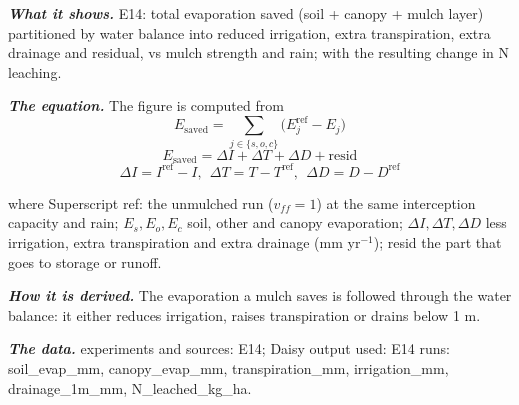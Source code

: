 \par\vspace{6pt}\noindent{}\par\nobreak
{}\label{fig:a20_3}
\par\noindent\textbf{\color{khmag}\emph{What it shows.}} E14: total evaporation saved (soil + canopy + mulch layer) partitioned by water balance into reduced irrigation, extra transpiration, extra drainage and residual, vs mulch strength and rain; with the resulting change in N leaching.
\par\noindent\textbf{\color{khmag}\emph{The equation.}} The figure is computed from
\begin{equation}\boxed{E_{\mathrm{saved}}=\sum_{j\in\{s,o,c\}}\bigl(E_j^{\mathrm{ref}}-E_j\bigr)}\end{equation}
\begin{equation}\boxed{E_{\mathrm{saved}}=\Delta I+\Delta T+\Delta D+\text{resid}}\end{equation}
\begin{equation}\boxed{\Delta I=I^{\mathrm{ref}}-I,\ \ \Delta T=T-T^{\mathrm{ref}},\ \ \Delta D=D-D^{\mathrm{ref}}}\end{equation}
\par\noindent where Superscript ref: the unmulched run ($v_{ff}=1$) at the same interception capacity and rain; $E_s,E_o,E_c$ soil, other and canopy evaporation; $\Delta I,\Delta T,\Delta D$ less irrigation, extra transpiration and extra drainage (mm yr$^{-1}$); resid the part that goes to storage or runoff.
\par\noindent\textbf{\color{khmag}\emph{How it is derived.}} The evaporation a mulch saves is followed through the water balance: it either reduces irrigation, raises transpiration or drains below 1 m.
\par\noindent\textbf{\color{khmag}\emph{The data.}} experiments and sources: E14; Daisy output used: E14 runs: soil\_evap\_mm, canopy\_evap\_mm, transpiration\_mm, irrigation\_mm, drainage\_1m\_mm, N\_leached\_kg\_ha.
\par\vspace{6pt}\noindent{}\par\nobreak
{}\label{fig:a20_4}

